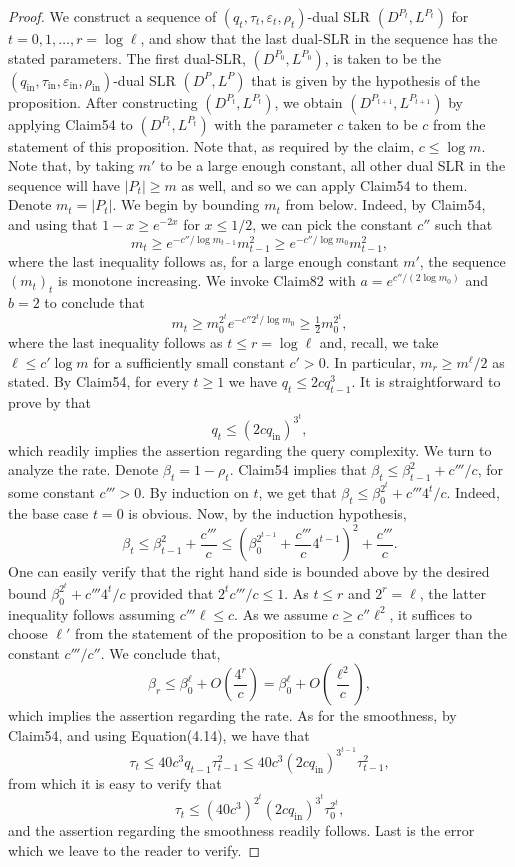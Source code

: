 \documentclass[10pt,a4paper]{article}
\begin{document}
\begin{proof}
We construct a sequence of $(q_t,\tau_t,\varepsilon_t,\rho_t)$-dual SLR $(D^{P_t},L^{P_t})$ for $t=0,1,\ldots,r=\log\ell$, and show that the last dual-SLR in the sequence has the stated parameters. The first dual-SLR, $(D^{P_0},L^{P_0})$, is taken to be the $(q_{\mathrm{in}},\tau_{\mathrm{in}},\varepsilon_{\mathrm{in}},\rho_{\mathrm{in}})$-dual SLR $(D^P,L^P)$ that is given by the hypothesis of the proposition. After constructing $(D^{P_t},L^{P_t})$, we obtain $(D^{P_{t+1}},L^{P_{t+1}})$ by applying Claim54 to $(D^{P_t},L^{P_t})$ with the parameter $c$ taken to be $c$ from the statement of this proposition. Note that, as required by the claim, $c\leq\log m$. Note that, by taking $m'$ to be a large enough constant, all other dual SLR in the sequence will have $|P_t|\geq m$ as well, and so we can apply Claim54 to them. Denote $m_t=|P_t|$. We begin by bounding $m_t$ from below. Indeed, by Claim54, and using that $1-x\geq e^{-2x}$ for $x\leq1/2$, we can pick the constant $c''$ such that
\[m_t\geq e^{-c''/\log m_{t-1}}m_{t-1}^2\geq e^{-c''/\log m_0}m_{t-1}^2,\]
where the last inequality follows as, for a large enough constant $m'$, the sequence $(m_t)_t$ is monotone increasing. We invoke Claim82 with $a=e^{c''/(2\log m_0)}$ and $b=2$ to conclude that
\[m_t\geq m_0^{2^t}e^{-c''2^t/\log m_0}\geq\tfrac12m_0^{2^t},\]
where the last inequality follows as $t\leq r=\log\ell$ and, recall, we take $\ell\leq c'\log m$ for a sufficiently small constant $c'>0$. In particular, $m_r\geq m^\ell/2$ as stated.
By Claim54, for every $t\geq1$ we have $q_t\leq2cq_{t-1}^3$. It is straightforward to prove by that
\begin{equation}q_t\leq(2cq_{\mathrm{in}})^{3^t},\tag{4.14}\end{equation}
which readily implies the assertion regarding the query complexity. We turn to analyze the rate. Denote $\beta_t=1-\rho_t$. Claim54 implies that $\beta_t\leq\beta_{t-1}^2+c'''/c$, for some constant $c'''>0$. By induction on $t$, we get that $\beta_t\leq\beta_0^{2^t}+c'''4^t/c$. Indeed, the base case $t=0$ is obvious. Now, by the induction hypothesis,
\[\beta_t\leq\beta_{t-1}^2+\frac{c'''}c\leq\left(\beta_0^{2^{t-1}}+\frac{c'''}c4^{t-1}\right)^2+\frac{c'''}c.\]
One can easily verify that the right hand side is bounded above by the desired bound $\beta_0^{2^t}+c'''4^t/c$ provided that $2^tc'''/c\leq1$. As $t\leq r$ and $2^r=\ell$, the latter inequality follows assuming $c'''\ell\leq c$. As we assume $c\geq c''\ell^2$, it suffices to choose $\ell'$ from the statement of the proposition to be a constant larger than the constant $c'''/c''$. We conclude that,
\[\beta_r\leq\beta_0^\ell+O\left(\frac{4^r}c\right)=\beta_0^\ell+O\left(\frac{\ell^2}c\right),\]
which implies the assertion regarding the rate.
As for the smoothness, by Claim54, and using Equation(4.14), we have that
\[\tau_t\leq40c^3q_{t-1}\tau_{t-1}^2\leq40c^3(2cq_{\mathrm{in}})^{3^{t-1}}\tau_{t-1}^2,\]
from which it is easy to verify that
\[\tau_t\leq(40c^3)^{2^t}(2cq_{\mathrm{in}})^{3^t}\tau_0^{2^t},\]
and the assertion regarding the smoothness readily follows. Last is the error which we leave to the reader to verify.
\end{proof}
\end{document}
